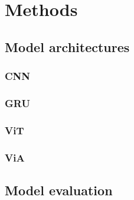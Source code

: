 


\chapter{Methods} %

\label{Chapter3} %







\section{Model architectures}

\subsection{CNN}

\subsection{GRU}

\subsection{ViT}

\subsection{ViA}


\section{Model evaluation}